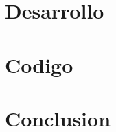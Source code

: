 \documentclass[12pt]{article}
\begin{document}
\begin{figure}[H]%
\centering
\caption{}
\label{fig:1}
\end{figure}

%


\begin{figure}[H]%
\centering
\caption*{}

\end{figure}
\newpage
\section{Desarrollo}
\newpage



\section{Codigo}











\newpage
\section{Conclusion}




	


\vspace{20 mm}






\printbibliography
\end{document}
